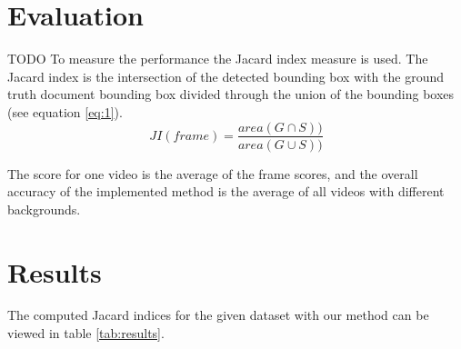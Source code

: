 \documentclass[english, paper=a4]{scrartcl}
\begin{document}
\section{Evaluation}
TODO
To measure the performance the Jacard index measure \cite{everingham2010pascal} is used. 
The Jacard index is the intersection of the detected bounding box with the ground truth document bounding box divided through the union of the bounding boxes (see equation \ref{eq:1}).
\begin{equation}\label{eq:1}
JI(frame)= \frac{area(G\cap S))}{area(G\cup S))}
\end{equation}

The score for one video is the average of the frame scores, and the overall accuracy of the implemented method is the average of all videos with different backgrounds.

\section{Results}

The computed Jacard indices for the given dataset with our method can be viewed in 
table \ref{tab:results}.
\end{document}
